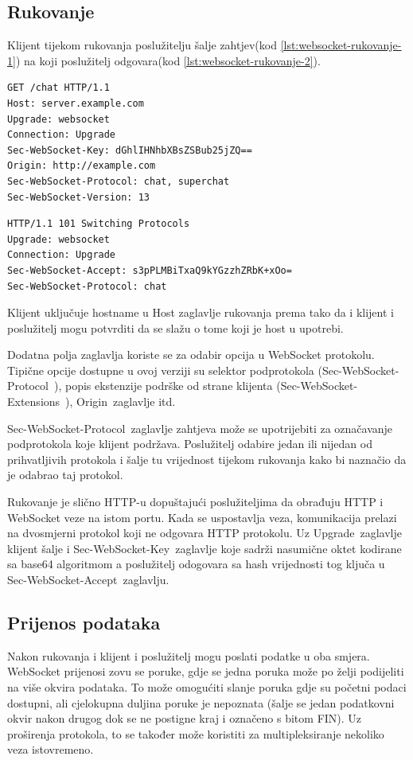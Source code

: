 \documentclass[times, utf8, zavrsni]{fer}
\begin{document}
\subsection{Rukovanje}
Klijent tijekom rukovanja poslužitelju šalje zahtjev(kod \ref{lst:websocket-rukovanje-1}) na koji poslužitelj odgovara(kod \ref{lst:websocket-rukovanje-2}).
\begin{lstlisting}[caption=Zahtjev klijenta tijekom rukovanja, label=lst:websocket-rukovanje-1, float, floatplacement=H]
GET /chat HTTP/1.1
Host: server.example.com
Upgrade: websocket
Connection: Upgrade
Sec-WebSocket-Key: dGhlIHNhbXBsZSBub25jZQ==
Origin: http://example.com
Sec-WebSocket-Protocol: chat, superchat
Sec-WebSocket-Version: 13
\end{lstlisting}

\begin{lstlisting}[caption=Odgovor poslužitelja tijekom rukovanja, label=lst:websocket-rukovanje-2, float, floatplacement=H]
HTTP/1.1 101 Switching Protocols
Upgrade: websocket
Connection: Upgrade
Sec-WebSocket-Accept: s3pPLMBiTxaQ9kYGzzhZRbK+xOo=
Sec-WebSocket-Protocol: chat
\end{lstlisting}

Klijent uključuje hostname u Host zaglavlje rukovanja prema tako da i klijent i poslužitelj mogu potvrditi da se slažu o tome koji je host u upotrebi.

Dodatna polja zaglavlja koriste se za odabir opcija u WebSocket protokolu. Tipične opcije dostupne u ovoj verziji su selektor podprotokola (\glqq Sec-WebSocket-Protocol\grqq\ ), popis ekstenzije podrške od strane klijenta (\glqq Sec-WebSocket-Extensions\grqq\ ), \glqq Origin\grqq\  zaglavlje itd. 

\glqq Sec-WebSocket-Protocol\grqq\  zaglavlje zahtjeva može se upotrijebiti za označavanje podprotokola koje klijent podržava. Poslužitelj odabire jedan ili nijedan od prihvatljivih protokola i šalje tu vrijednost tijekom rukovanja kako bi naznačio da je odabrao taj protokol.

Rukovanje je slično HTTP-u dopuštajući poslužiteljima da obrađuju HTTP i WebSocket veze na istom portu. Kada se uspostavlja veza, komunikacija prelazi na dvosmjerni protokol koji ne odgovara HTTP protokolu. Uz \glqq Upgrade\grqq\  zaglavlje klijent šalje i \glqq Sec-WebSocket-Key\grqq\  zaglavlje koje sadrži nasumične oktet kodirane sa base64 algoritmom a poslužitelj odogovara sa hash vrijednosti tog ključa u \glqq Sec-WebSocket-Accept\grqq\  zaglavlju.

\subsection{Prijenos podataka}
Nakon rukovanja i klijent i poslužitelj mogu poslati podatke u oba smjera. WebSocket prijenosi zovu se poruke, gdje se jedna poruka može po želji podijeliti na više okvira podataka. To može omogućiti slanje poruka gdje su početni podaci dostupni, ali cjelokupna duljina poruke je nepoznata (šalje se jedan podatkovni okvir nakon drugog dok se ne postigne kraj i označeno s bitom FIN). Uz proširenja protokola, to se također može koristiti za multipleksiranje nekoliko veza istovremeno. 
\end{document}
